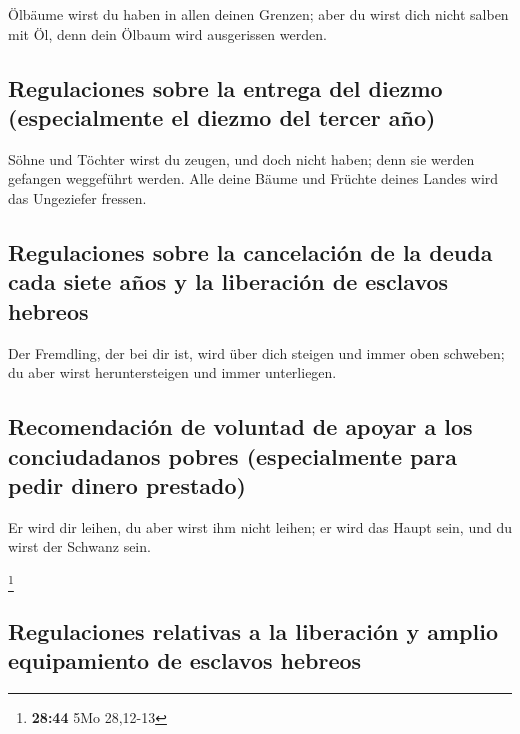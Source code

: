  Ölbäume wirst du haben in allen deinen Grenzen; aber du
wirst dich nicht salben mit Öl, denn dein Ölbaum wird ausgerissen
werden.

\hypertarget{regulaciones-sobre-la-entrega-del-diezmo-especialmente-el-diezmo-del-tercer-auxf1o}{%
\subsection{Regulaciones sobre la entrega del diezmo (especialmente el
diezmo del tercer
año)}\label{regulaciones-sobre-la-entrega-del-diezmo-especialmente-el-diezmo-del-tercer-auxf1o}}

 Söhne und Töchter wirst du zeugen, und doch nicht haben;
denn sie werden gefangen weggeführt werden.  Alle deine
Bäume und Früchte deines Landes wird das Ungeziefer fressen.

\hypertarget{regulaciones-sobre-la-cancelaciuxf3n-de-la-deuda-cada-siete-auxf1os-y-la-liberaciuxf3n-de-esclavos-hebreos}{%
\subsection{Regulaciones sobre la cancelación de la deuda cada siete
años y la liberación de esclavos
hebreos}\label{regulaciones-sobre-la-cancelaciuxf3n-de-la-deuda-cada-siete-auxf1os-y-la-liberaciuxf3n-de-esclavos-hebreos}}

 Der Fremdling, der bei dir ist, wird über dich steigen
und immer oben schweben; du aber wirst heruntersteigen und immer
unterliegen.

\hypertarget{recomendaciuxf3n-de-voluntad-de-apoyar-a-los-conciudadanos-pobres-especialmente-para-pedir-dinero-prestado}{%
\subsection{Recomendación de voluntad de apoyar a los conciudadanos
pobres (especialmente para pedir dinero
prestado)}\label{recomendaciuxf3n-de-voluntad-de-apoyar-a-los-conciudadanos-pobres-especialmente-para-pedir-dinero-prestado}}

 Er wird dir leihen, du aber wirst ihm nicht leihen; er
wird das Haupt sein, und du wirst der Schwanz sein.

\footnote{\textbf{28:44} 5Mo 28,12-13}

\hypertarget{regulaciones-relativas-a-la-liberaciuxf3n-y-amplio-equipamiento-de-esclavos-hebreos}{%
\subsection{Regulaciones relativas a la liberación y amplio equipamiento
de esclavos
hebreos}\label{regulaciones-relativas-a-la-liberaciuxf3n-y-amplio-equipamiento-de-esclavos-hebreos}}

